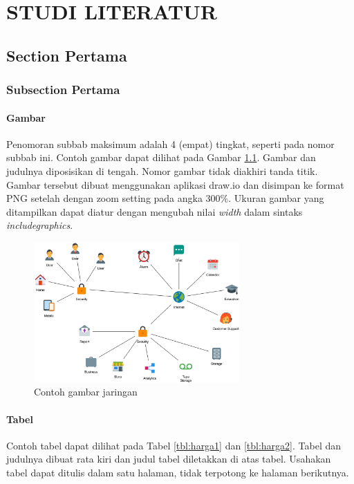 \documentclass[12pt,a4paper,oneside]{book}
\begin{document}
\chapter{STUDI LITERATUR}
\section{Section Pertama}
\lipsum[1]
\subsection{Subsection Pertama}
\lipsum[2]
\subsubsection{Gambar}
Penomoran subbab maksimum adalah 4 (empat) tingkat, seperti pada nomor subbab ini. Contoh gambar dapat dilihat pada Gambar \ref{gambar:jaringan}. Gambar dan judulnya diposisikan di tengah. Nomor gambar tidak diakhiri tanda titik. Gambar tersebut dibuat menggunakan aplikasi draw.io dan disimpan ke format PNG setelah dengan zoom setting pada angka 300\%. Ukuran gambar yang ditampilkan dapat diatur dengan mengubah nilai \textit{width} dalam sintaks \textit{includegraphics}.

\begin{figure}[t] %
	\centering
    	\includegraphics[width=0.7\textwidth]{gambar1.png}
	\caption{Contoh gambar jaringan}
	\label{gambar:jaringan}
\end{figure}


\subsubsection{Tabel}
Contoh tabel dapat dilihat pada Tabel \ref{tbl:harga1} dan \ref{tbl:harga2}. Tabel dan judulnya dibuat rata kiri dan judul tabel diletakkan di atas tabel. Usahakan tabel dapat ditulis dalam satu halaman, tidak terpotong ke halaman berikutnya.
\end{document}
